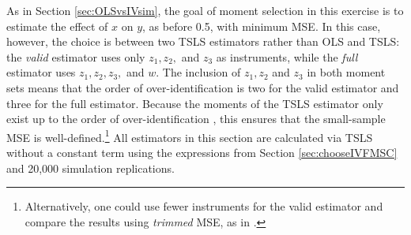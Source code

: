 As in Section \ref{sec:OLSvsIVsim}, the goal of moment selection in this exercise is to estimate the effect of $x$ on $y$, as before 0.5, with minimum MSE.
In this case, however, the choice is between two TSLS estimators rather than OLS and TSLS: the \emph{valid} estimator uses only $z_1, z_2,$ and $z_3$ as instruments, while the \emph{full} estimator uses $z_1, z_2, z_3,$ and $w$.
The inclusion of $z_1, z_2$ and $z_3$ in both moment sets means that the order of over-identification is two for the valid estimator and three for the full estimator. 
Because the moments of the TSLS estimator only exist up to the order of over-identification \citep{Phillips1980}, this ensures that the small-sample MSE is well-defined.\footnote{Alternatively, one could use fewer instruments for the valid estimator and compare the results using \emph{trimmed} MSE, as in \cite{Hansen2013}.}
All estimators in this section are calculated via TSLS without a constant term using the expressions from Section \ref{sec:chooseIVFMSC} and 20,000 simulation replications.
 
